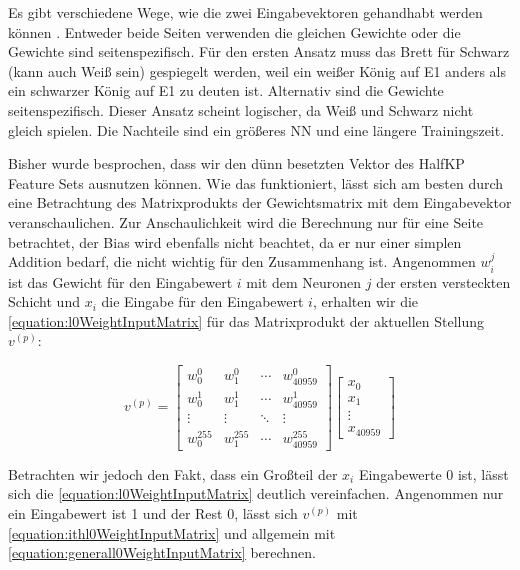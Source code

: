 Es gibt verschiedene Wege, wie die zwei Eingabevektoren gehandhabt werden können \cite{StockfishNNUE}. Entweder beide Seiten verwenden die gleichen Gewichte oder die Gewichte sind seitenspezifisch. Für den ersten Ansatz muss das Brett für Schwarz (kann auch Weiß sein) gespiegelt werden, weil ein weißer König auf E1 anders als ein schwarzer König auf E1 zu deuten ist. Alternativ sind die Gewichte seitenspezifisch. Dieser Ansatz scheint logischer, da Weiß und Schwarz nicht gleich spielen. Die Nachteile sind ein größeres \ac{NN} und eine längere Trainingszeit.

Bisher wurde besprochen, dass wir den dünn besetzten Vektor des HalfKP Feature Sets ausnutzen können. Wie das funktioniert, lässt sich am besten durch eine Betrachtung des Matrixprodukts der Gewichtsmatrix mit dem Eingabevektor veranschaulichen. Zur Anschaulichkeit wird die Berechnung nur für eine Seite betrachtet, der Bias wird ebenfalls nicht beachtet, da er nur einer simplen Addition bedarf, die nicht wichtig für den Zusammenhang ist. Angenommen $w_{i}^{j}$ ist das Gewicht für den Eingabewert $i$ mit dem Neuronen $j$ der ersten versteckten Schicht und $x_{i}$ die Eingabe für den Eingabewert $i$, erhalten wir die \autoref{equation:l0WeightInputMatrix} für das Matrixprodukt der aktuellen Stellung $v^{(p)}$:

\begin{equation}
  v^{(p)}=\begin{bmatrix}
    w_{0}^{0}   & w_{1}^{0}   & \cdots & w_{40959}^{0}   \\
    w_{0}^{1}   & w_{1}^{1}   & \cdots & w_{40959}^{1}   \\
    \vdots      & \vdots      & \ddots & \vdots          \\
    w_{0}^{255} & w_{1}^{255} & \cdots & w_{40959}^{255}
  \end{bmatrix} \begin{bmatrix}
    x_{0}  \\
    x_{1}  \\
    \vdots \\
    x_{40959}
  \end{bmatrix}
  \label{equation:l0WeightInputMatrix}
\end{equation}

Betrachten wir jedoch den Fakt, dass ein Großteil der $x_{i}$ Eingabewerte 0 ist, lässt sich die \autoref{equation:l0WeightInputMatrix} deutlich vereinfachen. Angenommen nur ein Eingabewert ist 1 und der Rest 0, lässt sich $v^{(p)}$ mit \autoref{equation:ithl0WeightInputMatrix} und allgemein mit \autoref{equation:generall0WeightInputMatrix} berechnen.

